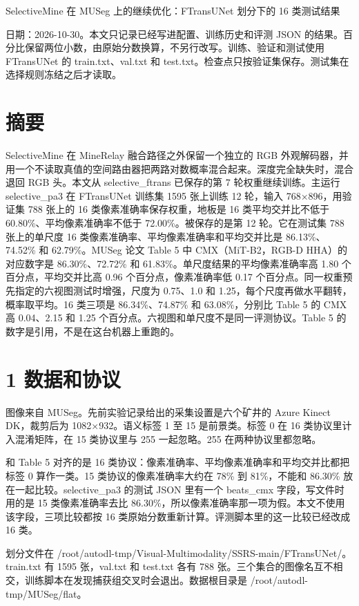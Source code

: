 \documentclass[11pt]{article}
\begin{document}
{\centering\Large SelectiveMine 在 MUSeg 上的继续优化：FTransUNet 划分下的 16 类测试结果\par}
\vspace{0.8em}
日期：2026-10-30。本文只记录已经写进配置、训练历史和评测 JSON 的结果。百分比保留两位小数，由原始分数换算，不另行改写。训练、验证和测试使用 FTransUNet 的 train.txt、val.txt 和 test.txt。检查点只按验证集保存。测试集在选择规则冻结之后才读取。

\section*{摘要}
SelectiveMine 在 MineRelay 融合路径之外保留一个独立的 RGB 外观解码器，并用一个不读取真值的空间路由器把两路对数概率混合起来。深度完全缺失时，混合退回 RGB 头。本文从 selective\_ftrans 已保存的第 7 轮权重继续训练。主运行 selective\_pa3 在 FTransUNet 训练集 1595 张上训练 12 轮，输入 768×896，用验证集 788 张上的 16 类像素准确率保存权重，地板是 16 类平均交并比不低于 60.80\%、平均像素准确率不低于 72.00\%。被保存的是第 12 轮。它在测试集 788 张上的单尺度 16 类像素准确率、平均像素准确率和平均交并比是 86.13\%、74.52\% 和 62.79\%。MUSeg 论文 Table 5 中 CMX（MiT-B2，RGB-D HHA）的对应数字是 86.30\%、72.72\% 和 61.83\%。单尺度结果的平均像素准确率高 1.80 个百分点，平均交并比高 0.96 个百分点，像素准确率低 0.17 个百分点。同一权重预先指定的六视图测试时增强，尺度为 0.75、1.0 和 1.25，每个尺度再做水平翻转，概率取平均。16 类三项是 86.34\%、74.87\% 和 63.08\%，分别比 Table 5 的 CMX 高 0.04、2.15 和 1.25 个百分点。六视图和单尺度不是同一评测协议。Table 5 的数字是引用，不是在这台机器上重跑的。

\section*{1  数据和协议}
图像来自 MUSeg。先前实验记录给出的采集设置是六个矿井的 Azure Kinect DK，裁剪后为 1082×932。语义标签 1 至 15 是前景类。标签 0 在 16 类协议里计入混淆矩阵，在 15 类协议里与 255 一起忽略。255 在两种协议里都忽略。

和 Table 5 对齐的是 16 类协议：像素准确率、平均像素准确率和平均交并比都把标签 0 算作一类。15 类协议的像素准确率大约在 78\% 到 81\%，不能和 86.30\% 放在一起比较。selective\_pa3 的测试 JSON 里有一个 beats\_cmx 字段，写文件时用的是 15 类像素准确率去比 86.30\%，所以像素准确率那一项为假。本文不使用该字段，三项比较都按 16 类原始分数重新计算。评测脚本里的这一比较已经改成 16 类。

划分文件在 /root/autodl-tmp/Visual-Multimodality/SSRS-main/FTransUNet/。train.txt 有 1595 张，val.txt 和 test.txt 各有 788 张。三个集合的图像名互不相交，训练脚本在发现捕获组交叉时会退出。数据根目录是 /root/autodl-tmp/MUSeg/flat。
\end{document}
